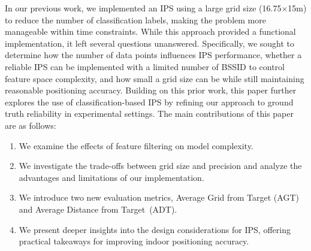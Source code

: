 \documentclass[runningheads]{llncs}
\begin{document}
In our previous work, we implemented an IPS using a large grid size (16.75$\times$15m) to reduce the number of classification labels, making the problem more manageable within time constraints. While this approach provided a functional implementation, it left several questions unanswered. Specifically, we sought to determine how the number of data points influences IPS performance, whether a reliable IPS can be implemented with a limited number of BSSID to control feature space complexity, and how small a grid size can be while still maintaining reasonable positioning accuracy.
Building on this prior work, this paper further explores the use of classification-based IPS by refining our approach to ground truth reliability in experimental settings. The main contributions of this paper are as follows:
\begin{enumerate}
	\item We examine the effects of feature filtering on model complexity.
	\item We investigate the trade-offs between grid size and precision and analyze the advantages and limitations of our implementation.
	\item We introduce two new evaluation metrics, Average Grid from Target (AGT) and Average Distance from Target~(ADT).
	\item We present deeper insights into the design considerations for IPS, offering practical takeaways for improving indoor positioning accuracy.
\end{enumerate}

\end{document}

